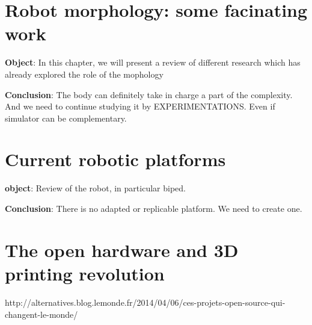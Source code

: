 




\chapter{Robot morphology: some facinating work} %

\textbf{Object}: In this chapter, we will present a review of different research which has already explored the role of the mophology


\textbf{Conclusion}: The body can definitely take in charge a part of the complexity. And we need to continue studying it by EXPERIMENTATIONS. Even if simulator can be complementary.



\chapter{Current robotic platforms} %

\textbf{object}: Review of the robot, in particular biped.


\textbf{Conclusion}: There is no adapted or replicable platform. We need to create one.




\chapter{The open hardware and 3D printing revolution} %

http://alternatives.blog.lemonde.fr/2014/04/06/ces-projets-open-source-qui-changent-le-monde/